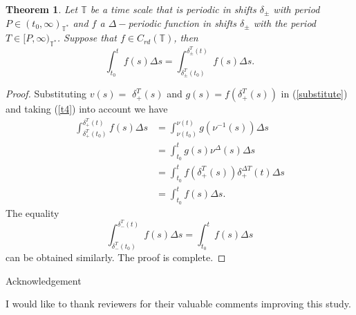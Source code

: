 \documentclass[b5paper,reqno]{amsart}\usepackage{amsfonts}
\newtheorem{theorem}{Theorem}
\theoremstyle{plain}
\numberwithin{equation}{section}
\begin{document}
\begin{theorem}
Let $\mathbb{T}$ be a time scale that is periodic in shifts $\delta_{\pm}$
with period $P\in(t_{0},\infty)_{\mathbb{T}^{\ast}}$ and $f$ a\emph{ }$\Delta-$periodic function in shifts\emph{ }$\delta_{\pm}$ with the period
$T\in\lbrack P,\infty)_{\mathbb{T}^{\ast}}$. Suppose that $f\in C_{rd}(\mathbb{T})$, then\[
\int_{t_{0}}^{t}f(s)\Delta s=\int_{\delta_{\pm}^{T}(t_{0})}^{\delta_{\pm}^{T}(t)}f(s)\Delta s.
\]

\end{theorem}

\begin{proof}
Substituting $v(s)=$ $\delta_{+}^{T}(s)$ and $g(s)=f(\delta_{+}^{T}\left(
s\right)  )$ in (\ref{substitute}) and taking (\ref{t4}) into account we have\begin{align*}
\int_{\delta_{+}^{T}(t_{0})}^{\delta_{+}^{T}(t)}f(s)\Delta s  &  =\int
_{\nu(t_{0})}^{\nu(t)}g(\nu^{-1}(s))\Delta s\\
&  =\int_{t_{0}}^{t}g(s)\nu^{\Delta}(s)\Delta s\\
&  =\int_{t_{0}}^{t}f(\delta_{+}^{T}\left(  s\right)  )\delta_{+}^{\Delta
T}(t)\Delta s\\
&  =\int_{t_{0}}^{t}f(s)\Delta s.
\end{align*}
The equality\[
\int_{\delta_{-}^{T}(t_{0})}^{\delta_{-}^{T}(t)}f(s)\Delta s=\int_{t_{0}}^{t}f(s)\Delta s
\]
can be obtained similarly. The proof is complete.
\end{proof}

\begin{center}
{\large Acknowledgement}
\end{center}

I would like to thank reviewers for their valuable comments improving this study.
\end{document}
